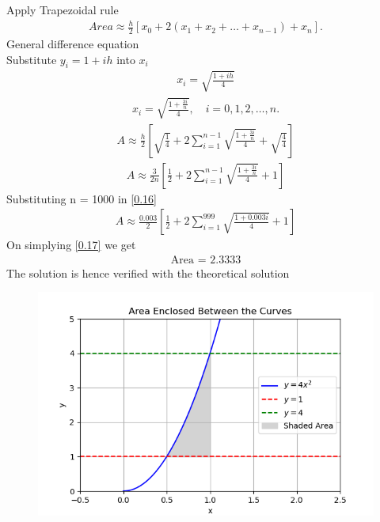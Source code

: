 \documentclass[journal]{IEEEtran}
\begin{document}
Apply Trapezoidal rule 
\begin{align}
    Area \approx \frac{h}{2} \left[ x_0 + 2(x_1 + x_2 + \dots + x_{n-1}) + x_n \right].
\end{align}
General difference equation \\
Substitute \( y_i = 1 + i h \) into \( x_i \)
\begin{align}
    x_i = \sqrt{\frac{1 + i h}{4}}
\end{align}
\begin{align}
   x_i = \sqrt{\frac{1 + \frac{3i}{n}}{4}}, \quad i = 0, 1, 2, \ldots, n.
\end{align}
\begin{align}
    A \approx \frac{h}{2} \left[ \sqrt{\frac{1}{4}} + 2 \sum_{i=1}^{n-1} \sqrt{\frac{1 + \frac{3i}{n}}{4}} + \sqrt{\frac{4}{4}} \right]
\end{align}
\begin{align}
    A \approx \frac{3}{2n} \left[ \frac{1}{2} + 2 \sum_{i=1}^{n-1} \sqrt{\frac{1 + \frac{3i}{n}}{4}} + 1 \right]
    \label{0.16}
\end{align}
Substituting n = 1000 in \ref{0.16}
\begin{align}
    A \approx \frac{0.003}{2} \left[ \frac{1}{2} + 2 \sum_{i=1}^{999} \sqrt{\frac{1 + 0.003i}{4}} + 1 \right]
    \label{0.17}
\end{align}
On simplying \ref{0.17} we get 
\begin{align*}
    \text{Area = 2.3333}
\end{align*}
The solution is hence verified with the theoretical solution 
\begin{figure}
    \centering
    \includegraphics[width=\columnwidth]{figs/Figure_1.png}
\end{figure}
\end{document}
